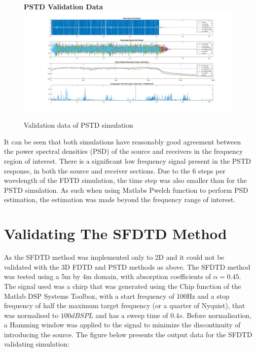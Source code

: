 \begin{figure}[H]
\centering
\textbf{PSTD Validation Data}
  \includegraphics[width=\textwidth]{./graphics/PSTDvalidationFinal.png}
  \caption{Validation data of PSTD simulation}
\end{figure}

It can be seen that both simulations have reasonably good agreement between the power spectral densities (PSD) of the source and receivers in the frequency region of interest. There is a significant low frequency signal present in the PSTD response, in both the source and receiver sections.  Due to the 6 steps per wavelength of the FDTD simulation, the time step was also smaller than for the PSTD simulation. As such when using Matlabs Pwelch function to perform PSD estimation, the estimation was made beyond the frequency range of interest.\\


\section{Validating The SFDTD Method}
As the SFDTD method was implemented only to 2D and it could not be validated with the 3D FDTD and PSTD methods as above. The SFDTD method was tested using a 5m by 4m domain, with absorption coefficients of $ \alpha = 0.45$. The signal used was a chirp that was generated using the Chip function of the Matlab DSP Systems Toolbox, with a start frequency of 100Hz and a stop frequency of half the maximum target frequency (or a quarter of Nyquist), that was normalised to $100dBSPL$ and has a sweep time of $0.4s$. Before normalisation, a Hamming window was applied to the signal to minimize the discontinuity of introducing the source. The figure below presents the output data for the SFDTD validating simulation:\\

